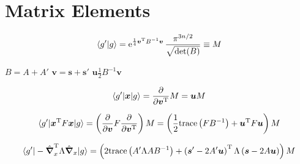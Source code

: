 \chapter{Matrix Elements}

\begin{equation}
	\braket{ g' |  g} = \operatorname{e} ^{\frac{1}{4} \boldsymbol{v}^{\mathrm{T}} B^{-1} \boldsymbol{v}}  \frac{\pi ^{3 n /2}}{\sqrt{\mathrm{det}(B)}} \equiv M 
\end{equation}

$B = A + A'$
$\boldsymbol{v} = \boldsymbol{s} + \boldsymbol{s}'$
$\boldsymbol{u} \frac{1}{2} B^{-1} \boldsymbol{v}$

\begin{equation}
	\braket{ g' | \boldsymbol{x} | g} =  \frac{\partial}{\partial \boldsymbol{v}^{\mathrm{T}}}  M = \boldsymbol{u} M
\end{equation}

\begin{equation}
	\braket{ g' | \boldsymbol{x}^{\mathrm{T}} F \boldsymbol{x} | g} = \left( \frac{\partial}{\partial \boldsymbol{v}} F \frac{\partial}{\partial \boldsymbol{v}^{\mathrm{T}}} \right) M = \left( \frac{1}{2} \mathrm{trace} \left( F B^{-1} \right) + \boldsymbol{u}^{\mathrm{T}} F \boldsymbol{u}  \right) M	
\end{equation}


\begin{equation}
	\braket{ g' | - \hat{\boldsymbol{\nabla}}_{x}^{\mathrm{T}} \Lambda \hat{\boldsymbol{\nabla}}_x | g} = \left( 2 \mathrm{trace} \left( A' \Lambda A B^{-1} \right) + \left( \boldsymbol{s}' - 2 A' \boldsymbol{u} \right)^{\mathrm{T}} \Lambda \left( \boldsymbol{s} - 2 A \boldsymbol{u} \right) \right) M
\end{equation}